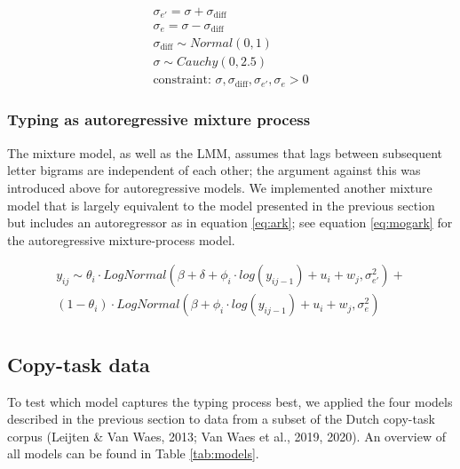 \documentclass[
  english,
  man,mask,floatsintext]{apa7}
\begin{document}
\begin{equation}
\begin{aligned}
\label{eq:mog3}
        \sigma_{e'} = \sigma + \sigma_{\text{diff}}\\
        \sigma_{e} = \sigma - \sigma_{\text{diff}}\\
        \sigma_{\text{diff}} \sim Normal(0,1)\\
        \sigma \sim Cauchy(0,2.5)\\
        \text{constraint: } \sigma, \sigma_{\text{diff}}, \sigma_{e'}, \sigma_{e} > 0
\end{aligned}   
\end{equation}

\hypertarget{typing-as-autoregressive-mixture-process}{%
\subsubsection{Typing as autoregressive mixture process}\label{typing-as-autoregressive-mixture-process}}

The mixture model, as well as the LMM, assumes that lags between subsequent letter bigrams are independent of each other; the argument against this was introduced above for autoregressive models. We implemented another mixture model that is largely equivalent to the model presented in the previous section but includes an autoregressor as in equation \ref{eq:ark}; see equation \ref{eq:mogark} for the autoregressive mixture-process model.

\begin{equation}
\begin{aligned}
\label{eq:mogark}
    y_{ij} \sim \theta_i \cdot LogNormal(\beta + \delta + \phi_i \cdot log(y_{ij-1}) + u_i + w_j, \sigma_{e'}^2) +\\
        (1 - \theta_i) \cdot LogNormal(\beta + \phi_i \cdot log(y_{ij-1}) + u_i + w_j, \sigma_{e}^2)\\
\end{aligned}   
\end{equation}

\hypertarget{copy-task-data}{%
\subsection{Copy-task data}\label{copy-task-data}}

To test which model captures the typing process best, we applied the four models described in the previous section to data from a subset of the Dutch copy-task corpus (Leijten \& Van Waes, 2013; Van Waes et al., 2019, 2020). An overview of all models can be found in Table \ref{tab:models}.
\end{document}
